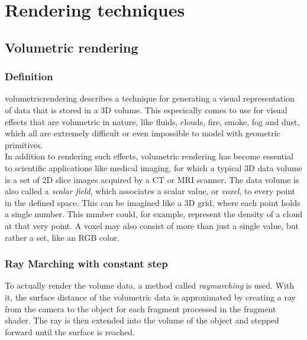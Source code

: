 \section{Rendering techniques}

\subsection{Volumetric rendering}
\label{section:volumetric-rendering}

\subsubsection{Definition}
\Gls{volumetricrendering} describes a technique for generating a visual representation of data that is stored in a 3D volume. 
This especically comes to use for visual effects that are volumetric in nature, like fluids, clouds, fire, smoke, fog and dust, which all are extremely difficult or even impossible to model with geometric primitives.
\\
In addition to rendering such effects, volumetric rendering has become essential to scientific applications like medical imaging, for which a typical 3D data volume is a set of 2D slice images acquired by a CT or MRI scanner.
\emptyline
The data volume is also called a \textit{scalar field}, which associates a scalar value, or \textit{voxel}, to every point in the defined space.
This can be imagined like a 3D grid, where each point holds a single number. This number could, for example, represent the density of a cloud at that very point.
A voxel may also consist of more than just a single value, but rather a set, like an RGB color.

\subsubsection{Ray Marching with constant step}
To actually render the volume data, a method called \textit{\gls{raymarching}} is used. With it, the surface distance of the volumetric data is approximated by creating a ray from the camera to the object for each fragment processed in the fragment shader. The ray is then extended into the volume of the object and stepped forward until the surface is reached.

